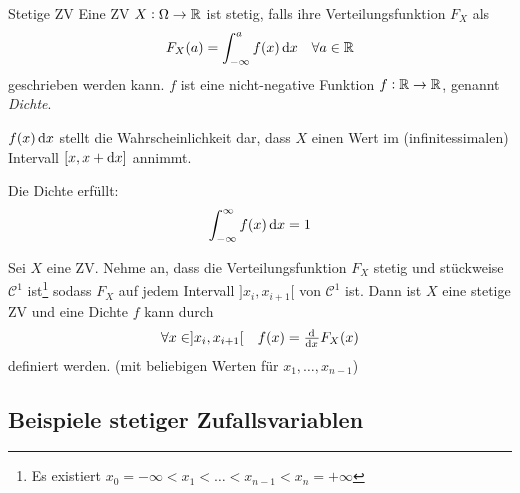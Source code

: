 \begin{definition}{Stetige ZV}
	Eine ZV $X : \Omega \rightarrow \mathbb{R}$ ist stetig, falls ihre Verteilungsfunktion $F_X$ als 
	\begin{equation*}
		F_X (a) = \int_{-\infty}^{a} f(x) \dif x \quad \forall a \in \R
	\end{equation*}
	geschrieben werden kann. $f$ ist eine nicht-negative Funktion $f : \mathbb{R} \rightarrow \mathbb{R}$, genannt \emph{Dichte}.
\end{definition}
$f(x) \dif x$ stellt die Wahrscheinlichkeit dar, dass $X$ einen Wert im (infinitessimalen) Intervall $[x,x + \dif x]$ annimmt.
\begin{prop}
	Die Dichte erfüllt:
	\begin{equation*}
		\int_{-\infty}^{\infty} f(x) \dif x = 1
	\end{equation*}
\end{prop}
\begin{prop}
	Sei $X$ eine ZV. Nehme an, dass die Verteilungsfunktion $F_X$ stetig und stückweise $\mathcal{C}^1$ ist\footnote{Es
	existiert $x_0 = - \infty < x_1 < \ldots < x_{n-1} < x_n = + \infty$} sodass $F_X$ auf jedem Intervall
	$]x_i,x_{i+1}[$ von $\mathcal{C}^1$ ist. Dann ist $X$ eine stetige ZV und eine Dichte $f$ kann durch
	\begin{equation*}
		\forall x \in ]x_i,x_{i+1}[ \quad f(x) = \od{}{x} F_X (x)
	\end{equation*}
	definiert werden. (mit beliebigen Werten für $x_1 , \ldots , x_{n-1}$)
\end{prop}


\subsection{Beispiele stetiger Zufallsvariablen}%
\label{sub:besipiele_stetiger_zufallsvariablen}

